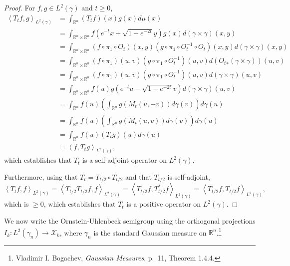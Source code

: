 \documentclass{article}
\newcommand{\inner}[2]{\left\langle #1, #2 \right\rangle}
\theoremstyle{definition}
\theoremstyle{definition}
\begin{document}
\begin{proof}
For $f,g \in L^2(\gamma)$ and $t \geq 0$,
\begin{align*}
\inner{T_t f}{g}_{L^2(\gamma)}&=\int_{\mathbb{R}^n} (T_t f)(x) g(x) d\mu(x)\\
&=\int_{\mathbb{R}^n \times \mathbb{R}^n} f\left(e^{-t}x+\sqrt{1-e^{-2t}}y\right) g(x) d(\gamma \times \gamma)(x,y)\\
&=\int_{\mathbb{R}^n \times \mathbb{R}^n} (f \circ \pi_1 \circ O_t)(x,y) (g \circ \pi_1 \circ O_t^{-1} \circ O_t)(x,y) d(\gamma \times \gamma)(x,y)\\
&=\int_{\mathbb{R}^n \times \mathbb{R}^n} (f \circ \pi_1)(u,v) (g \circ \pi_1 \circ O_t^{-1})(u,v) d({O_t}_* (\gamma \times \gamma))(u,v)\\
&=\int_{\mathbb{R}^n \times \mathbb{R}^n} (f \circ \pi_1)(u,v) (g \circ \pi_1 \circ O_t^{-1})(u,v) d(\gamma \times \gamma)(u,v)\\
&=\int_{\mathbb{R}^n \times \mathbb{R}^n} f(u)g\left(e^{-t}u-\sqrt{1-e^{-2t}}v\right) d(\gamma \times \gamma)(u,v)\\
&=\int_{\mathbb{R}^n} f(u) \left(\int_{\mathbb{R}^n} g(M_t(u,-v)) d\gamma(v) \right) d\gamma(u)\\
&=\int_{\mathbb{R}^n} f(u)  \left(\int_{\mathbb{R}^n} g(M_t(u,v)) d\gamma(v) \right) d\gamma(u)\\
&=\int_{\mathbb{R}^n} f(u) (T_tg)(u) d\gamma(u)\\
&=\inner{f}{T_tg}_{L^2(\gamma)},
\end{align*}
which establishes that $T_t$ is a self-adjoint operator on $L^2(\gamma)$. 

Furthermore, using that $T_t = T_{t/2} \circ T_{t/2}$ and that $T_{t/2}$ is self-adjoint,
\[
\inner{T_t f}{f}_{L^2(\gamma)}
=\inner{T_{t/2} T_{t/2} f}{f}_{L^2(\gamma)}
=\inner{T_{t/2} f}{T_{t/2}^* f}_{L^2(\gamma)}
=\inner{T_{t/2} f}{T_{t/2} f}_{L^2(\gamma)},
\]
which is $\geq 0$, which establishes that $T_t$ is a positive operator on $L^2(\gamma)$.
\end{proof}


We now write the Ornstein-Uhlenbeck semigroup using the orthogonal projections $I_k:L^2(\gamma_n) \to 
\mathcal{X}_k$, where $\gamma_n$ is the standard Gaussian measure on $\mathbb{R}^n$.\footnote{Vladimir I. Bogachev,
{\em Gaussian Measures}, p.~11, Theorem 1.4.4.}
\end{document}
